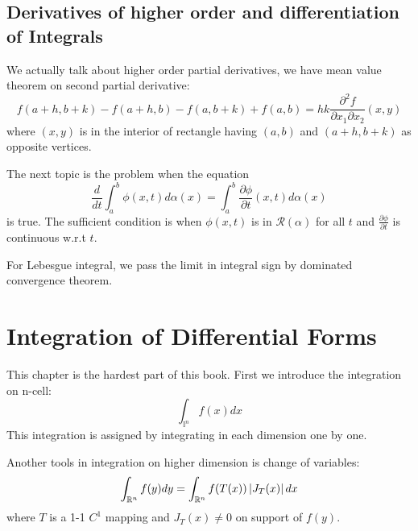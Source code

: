 \section{Derivatives of higher order and differentiation of Integrals}
We actually talk about higher order partial derivatives, we have mean value theorem on second partial derivative:
\begin{equation*}
    f(a+h,b+k)-f(a+h,b)-f(a,b+k)+f(a,b)=hk\frac{\partial^2 f}{\partial x_1\partial x_2}(x,y)
\end{equation*}
where $(x,y)$ is in the interior of rectangle having $(a,b)$ and $(a+h,b+k)$ as opposite vertices.\par
The next topic is the problem when the equation
\begin{equation*}
    \frac{d}{dt}\int_{a}^{b}\phi(x,t)d\alpha(x)=\int_{a}^{b}\frac{\partial \phi}{\partial t}(x,t)d\alpha(x)
\end{equation*}
is true. The sufficient condition is when $\phi(x,t)$ is in $\mathscr{R}(\alpha)$ for all $t$ and $\frac{\partial \phi}{\partial t}$ is continuous w.r.t $t$.\par
For Lebesgue integral, we pass the limit in integral sign by dominated convergence theorem.
\chapter{Integration of Differential Forms}
This chapter is the hardest part of this book. First we introduce the integration on n-cell:
\begin{equation*}
    \int_{\mathbb{I}^n}{f(x)dx}
\end{equation*}
This integration is assigned by integrating in each dimension one by one.\par
Another tools in integration on higher dimension is change of variables:
\begin{equation*}
    \int_{\mathbb{R}^n}{f(y)dy}=\int_{\mathbb{R}^n}{f(T(x))\left\lvert J_T(x)\right\rvert dx}
\end{equation*}
where $T$ is a 1-1 $C^1$ mapping and $J_T(x)\neq 0$ on support of $f(y)$.
